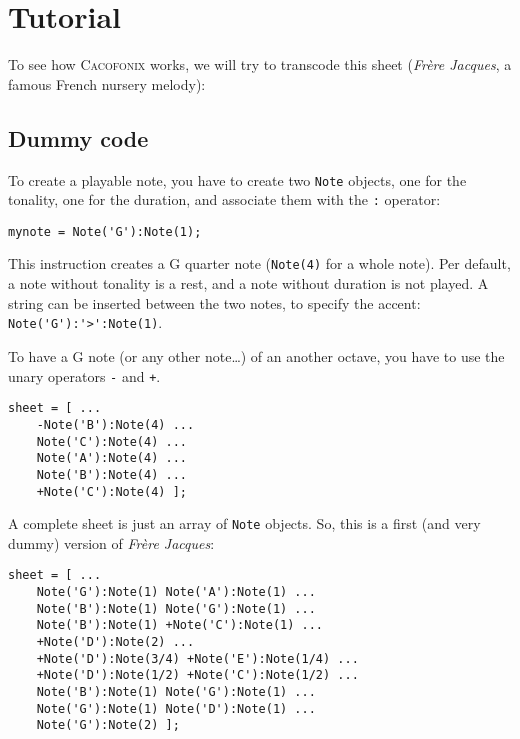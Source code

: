 \documentclass{article}
\newcommand\cacofonix{\textsc{Cacofonix}\xspace}
\newcommand\note{\lstinline!Note!\xspace}
\newcommand\frerejaques{\emph{Fr\`ere Jacques}\xspace}
\begin{document}
\section{Tutorial}

To see how \cacofonix works, we will try to transcode this sheet (\frerejaques, a famous French nursery melody):\\

\subsection{Dummy code}

To create a playable note, you have to create two \note objects, one for the tonality, one for the duration, and associate them with the \lstinline!:! operator:
\begin{lstlisting}
mynote = Note('G'):Note(1);
\end{lstlisting}
This instruction creates a G quarter note (\lstinline!Note(4)! for a whole note). Per default, a note without tonality is a rest, and a note without duration is not played. A string can be inserted between the two notes, to specify the accent: \lstinline!Note('G'):'>':Note(1)!.

To have a G note (or any other note\dots) of an another octave, you have to use the unary operators \lstinline!-! and \lstinline!+!. \\
\begin{lstlisting}
sheet = [ ...
	-Note('B'):Note(4) ...
	Note('C'):Note(4) ...
	Note('A'):Note(4) ...
	Note('B'):Note(4) ...
	+Note('C'):Note(4) ];
\end{lstlisting}

A complete sheet is just an array of \lstinline!Note! objects. So, this is a first (and very dummy) version of \frerejaques:
\begin{lstlisting}
sheet = [ ...
	Note('G'):Note(1) Note('A'):Note(1) ...
	Note('B'):Note(1) Note('G'):Note(1) ...
	Note('B'):Note(1) +Note('C'):Note(1) ...
	+Note('D'):Note(2) ...
	+Note('D'):Note(3/4) +Note('E'):Note(1/4) ...
	+Note('D'):Note(1/2) +Note('C'):Note(1/2) ...
	Note('B'):Note(1) Note('G'):Note(1) ...
	Note('G'):Note(1) Note('D'):Note(1) ...
	Note('G'):Note(2) ];
\end{lstlisting}
\end{document}
